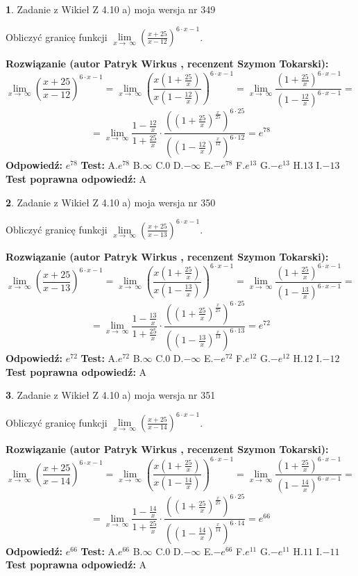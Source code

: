 \documentclass[12pt, a4paper]{article}
\theoremstyle{definition} %
\newtheorem{zad}{}
\newcommand{\zadStart}[1]{\begin{zad}#1\newline}
\newcommand{\zadStop}{\end{zad}}
\newcommand{\rozwStart}[2]{\noindent \textbf{Rozwiązanie (autor #1 , recenzent #2): }\newline}
\newcommand{\rozwStop}{\newline}
\newcommand{\odpStart}{\noindent \textbf{Odpowiedź:}\newline}
\newcommand{\odpStop}{\newline}
\newcommand{\testStart}{\noindent \textbf{Test:}\newline}
\newcommand{\testStop}{\newline}
\newcommand{\kluczStart}{\noindent \textbf{Test poprawna odpowiedź:}\newline}
\newcommand{\kluczStop}{\newline}
\begin{document}
\zadStart{Zadanie z Wikieł Z 4.10 a) moja wersja nr 349}

Obliczyć granicę funkcji  $\lim\limits_{x\to\ \infty}(\frac{x+25}{x-12})^{6\cdot x-1}$.
\zadStop
\rozwStart{Patryk Wirkus}{Szymon Tokarski}
$$\lim\limits_{x\to\ \infty}(\frac{x+25}{x-12})^{6\cdot x-1} = \lim\limits_{x\to\ \infty}(\frac{x(1+\frac{25}{x})}{x(1-\frac{12}{x})})^{6\cdot x-1}=\lim\limits_{x\to\ \infty}\frac{(1+\frac{25}{x})^{6\cdot x-1}}{(1-\frac{12}{x})^{6\cdot x-1}}=$$
$$=\lim\limits_{x\to\ \infty}\frac{1-\frac{12}{x}}{1+\frac{25}{x}}\cdot\frac{((1+\frac{25}{x})^{\frac{x}{25}})^{6\cdot25}}{((1-\frac{12}{x})^{\frac{x}{12}})^{6\cdot12}}=e^{78}$$
\rozwStop
\odpStart
$e^{78}$
\odpStop
\testStart
A.$e^{78}$ B.$\infty$ C.$0$ D.$-\infty$ E.$-e^{78}$
F.$e^{13}$ G.$-e^{13}$
H.$13$
I.$-13$
\testStop
\kluczStart
A
\kluczStop



\zadStart{Zadanie z Wikieł Z 4.10 a) moja wersja nr 350}

Obliczyć granicę funkcji  $\lim\limits_{x\to\ \infty}(\frac{x+25}{x-13})^{6\cdot x-1}$.
\zadStop
\rozwStart{Patryk Wirkus}{Szymon Tokarski}
$$\lim\limits_{x\to\ \infty}(\frac{x+25}{x-13})^{6\cdot x-1} = \lim\limits_{x\to\ \infty}(\frac{x(1+\frac{25}{x})}{x(1-\frac{13}{x})})^{6\cdot x-1}=\lim\limits_{x\to\ \infty}\frac{(1+\frac{25}{x})^{6\cdot x-1}}{(1-\frac{13}{x})^{6\cdot x-1}}=$$
$$=\lim\limits_{x\to\ \infty}\frac{1-\frac{13}{x}}{1+\frac{25}{x}}\cdot\frac{((1+\frac{25}{x})^{\frac{x}{25}})^{6\cdot25}}{((1-\frac{13}{x})^{\frac{x}{13}})^{6\cdot13}}=e^{72}$$
\rozwStop
\odpStart
$e^{72}$
\odpStop
\testStart
A.$e^{72}$ B.$\infty$ C.$0$ D.$-\infty$ E.$-e^{72}$
F.$e^{12}$ G.$-e^{12}$
H.$12$
I.$-12$
\testStop
\kluczStart
A
\kluczStop



\zadStart{Zadanie z Wikieł Z 4.10 a) moja wersja nr 351}

Obliczyć granicę funkcji  $\lim\limits_{x\to\ \infty}(\frac{x+25}{x-14})^{6\cdot x-1}$.
\zadStop
\rozwStart{Patryk Wirkus}{Szymon Tokarski}
$$\lim\limits_{x\to\ \infty}(\frac{x+25}{x-14})^{6\cdot x-1} = \lim\limits_{x\to\ \infty}(\frac{x(1+\frac{25}{x})}{x(1-\frac{14}{x})})^{6\cdot x-1}=\lim\limits_{x\to\ \infty}\frac{(1+\frac{25}{x})^{6\cdot x-1}}{(1-\frac{14}{x})^{6\cdot x-1}}=$$
$$=\lim\limits_{x\to\ \infty}\frac{1-\frac{14}{x}}{1+\frac{25}{x}}\cdot\frac{((1+\frac{25}{x})^{\frac{x}{25}})^{6\cdot25}}{((1-\frac{14}{x})^{\frac{x}{14}})^{6\cdot14}}=e^{66}$$
\rozwStop
\odpStart
$e^{66}$
\odpStop
\testStart
A.$e^{66}$ B.$\infty$ C.$0$ D.$-\infty$ E.$-e^{66}$
F.$e^{11}$ G.$-e^{11}$
H.$11$
I.$-11$
\testStop
\kluczStart
A
\kluczStop
\end{document}
